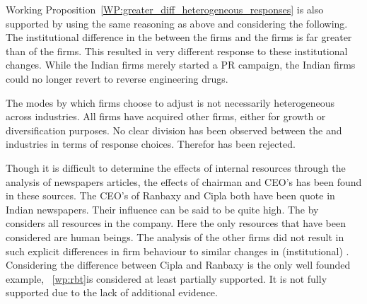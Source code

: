 Working Proposition~\ref{WP:greater_diff_heterogeneous_responses} is also supported by using the same reasoning as above and considering the following.
The institutional difference in the \rr between the  \pharma firms and the  \pharma firms is far greater than of the \its firms.
This resulted in very different response to these institutional changes.
While the Indian \its firms merely started a PR campaign, the Indian \pharma firms could no longer revert to reverse engineering drugs.

The modes by which firms choose to adjust is not necessarily heterogeneous across industries.
All firms have acquired other firms, either for growth or diversification purposes. 
No clear division has been observed between the \pharma and \its industries in terms of response choices.
Therefor \wpro has been rejected.

Though it is difficult to determine the effects of internal resources through the analysis of newspapers articles, the effects of chairman and CEO's has been found in these sources.
The CEO's of Ranbaxy and Cipla both have been quote in Indian newspapers.
Their influence can be said to be quite high.
The \rbt by~\citep{Barney:2011jp,Barney:1991ur} considers all  resources in the company.
Here the only resources that have been considered are human beings.
The analysis of the other firms did not result in such explicit differences in firm behaviour to similar changes in (institutional) \rr.
Considering the difference between Cipla and Ranbaxy is the only well founded example, \wpro~\ref{wp:rbt}is considered at least partially supported.
It is not fully supported due to the lack of additional evidence.  




%